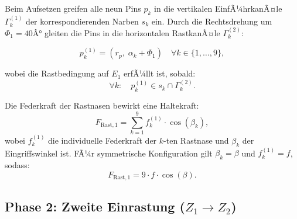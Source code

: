 ﻿\documentclass[12pt, a4paper]{article}
\theoremstyle{remark}
\begin{document}
Beim Aufsetzen greifen alle neun Pins $p_k$ in die vertikalen EinfÃ¼hrkanÃ¤le $\Gamma_k^{(1)}$ der
korrespondierenden Narben $s_k$ ein. Durch die Rechtsdrehung um $\Phi_1 = 40Â°$ gleiten die Pins
in die horizontalen RastkanÃ¤le $\Gamma_k^{(2)}$:

\begin{equation}
  p_k^{(1)} = \left(r_p,\; \alpha_k + \Phi_1\right) \quad \forall k \in \{1,\ldots,9\},
\end{equation}

wobei die Rastbedingung auf $E_1$ erfÃ¼llt ist, sobald:
\begin{equation}
  \label{eq:rastbedingung1}
  \forall k: \quad p_k^{(1)} \in s_k \cap \Gamma_k^{(2)}.
\end{equation}

Die Federkraft der Rastnasen bewirkt eine Haltekraft:
\begin{equation}
  F_{\text{Rast},1} = \sum_{k=1}^{9} f_k^{(1)} \cdot \cos(\beta_k),
\end{equation}
wobei $f_k^{(1)}$ die individuelle Federkraft der $k$-ten Rastnase und $\beta_k$ der
Eingriffswinkel ist. FÃ¼r symmetrische Konfiguration gilt $\beta_k = \beta$ und $f_k^{(1)} = f$, sodass:
\begin{equation}
  F_{\text{Rast},1} = 9 \cdot f \cdot \cos(\beta).
\end{equation}

\subsection{Phase 2: Zweite Einrastung ($Z_1 \to Z_2$)}
\end{document}
